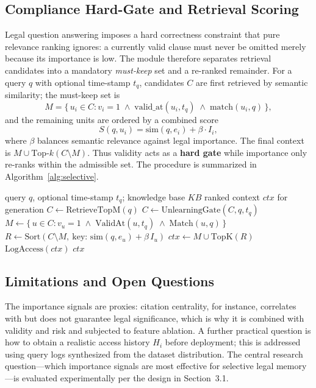 \subsection{Compliance Hard-Gate and Retrieval Scoring}
Legal question answering imposes a hard correctness constraint that pure relevance ranking ignores: a currently valid clause must never be omitted merely because its importance is low. The module therefore separates retrieval candidates into a mandatory \emph{must-keep} set and a re-ranked remainder. For a query $q$ with optional time-stamp $t_q$, candidates $C$ are first retrieved by semantic similarity; the must-keep set is
\begin{equation}
    M = \{\, u_i \in C : v_i = 1 \;\wedge\; \mathrm{valid\_at}(u_i, t_q) \;\wedge\; \mathrm{match}(u_i, q) \,\},
\end{equation}
and the remaining units are ordered by a combined score
\begin{equation}
    S(q, u_i) = \mathrm{sim}(q, e_i) + \beta \cdot I_i ,
\end{equation}
where $\beta$ balances semantic relevance against legal importance. The final context is $M \cup \mathrm{Top\text{-}}k(C \setminus M)$. Thus validity acts as a \textbf{hard gate} while importance only re-ranks within the admissible set. The procedure is summarized in Algorithm~\ref{alg:selective}.

\begin{algorithm}[H]
\caption{Selective retrieval with compliance hard-gate}
\label{alg:selective}
\begin{algorithmic}[1]
\Require query $q$, optional time-stamp $t_q$; knowledge base $KB$
\Ensure ranked context $\mathit{ctx}$ for generation
\State $C \gets \mathrm{RetrieveTopM}(q)$ 
\State $C \gets \mathrm{UnlearningGate}(C, q, t_q)$ 
\State $M \gets \{\, u \in C : v_u = 1 \;\wedge\; \mathrm{ValidAt}(u, t_q) \;\wedge\; \mathrm{Match}(u, q) \,\}$ 
\State $R \gets \mathrm{Sort}\!\left(C \setminus M,\ \text{key: } \mathrm{sim}(q, e_u) + \beta\, I_u\right)$ 
\State $\mathit{ctx} \gets M \cup \mathrm{TopK}(R)$
\State $\mathrm{LogAccess}(\mathit{ctx})$ 
\State \Return $\mathit{ctx}$
\end{algorithmic}
\end{algorithm}

\subsection{Limitations and Open Questions}
The importance signals are proxies: citation centrality, for instance, correlates with but does not guarantee legal significance, which is why it is combined with validity and risk and subjected to feature ablation. A further practical question is how to obtain a realistic access history $H_i$ before deployment; this is addressed using query logs synthesized from the dataset distribution. The central research question---which importance signals are most effective for selective legal memory---is evaluated experimentally per the design in Section~3.1.
